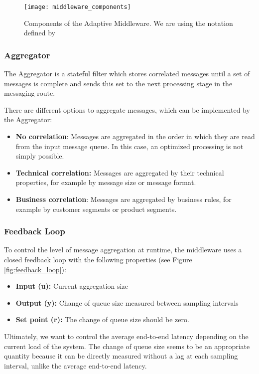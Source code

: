 \begin{figure*}[!t]
	\centering
	\texttt{[image: middleware\_components]}
	\caption{Components of the Adaptive Middleware. We are using the notation defined by \cite{Hohpe:2003fk}}
	\label{fig:middleware_components}
\end{figure*}
\subsubsection{Aggregator}
The Aggregator is a stateful filter which stores correlated messages until a set of messages is complete and sends this set to the next processing stage in the messaging route. 

There are different options to aggregate messages, which can be implemented by the Aggregator:

\begin{itemize}
	\item \textbf{No correlation}: Messages are aggregated in the order in which they are read from the input message queue. In this case, an optimized processing is not simply possible.
	\item \textbf{Technical correlation:} Messages are aggregated by their technical properties, for example by message size or message format.
	\item \textbf{Business correlation}: Messages are aggregated by business rules, for example by customer segments or product segments.
\end{itemize}

\subsubsection{Feedback Loop}

To control the level of message aggregation at runtime, the middleware uses a closed feedback loop with the following properties (see Figure \ref{fig:feedback_loop}):

\begin{itemize}
	\item \textbf{Input (u):} Current aggregation size
	\item \textbf{Output (y):} Change of queue size measured between sampling intervals
	\item \textbf{Set point (r):} The change of queue size should be zero.
\end{itemize}

Ultimately, we want to control the average end-to-end latency depending on the current load of the system. The change of queue size seems to be an appropriate quantity because it can be directly measured without a lag at each sampling interval, unlike the average end-to-end latency.

